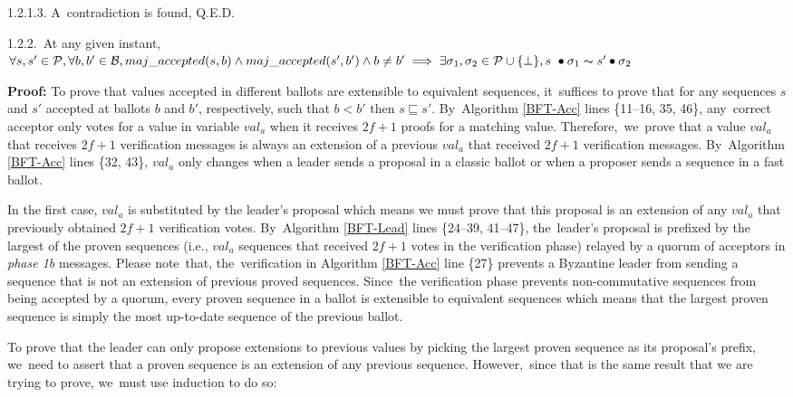 \documentclass[algorithms,article,accept,moreauthors,pdftex,10pt,a4paper]{Definitions/mdpi}
\begin{document}
\indent\indent\indent\indent\indent\indent\indent\parbox{\linewidth}{\strut1.2.1.3. A~contradiction is found, Q.E.D. }\par
\indent\indent\indent\indent\indent\parbox{\linewidth-11mm-\algorithmicindent*5}{\strut1.2.2.~At any given instant, $\forall s,s' \in \mathcal{P},\forall b,b' \in \mathcal{B}, maj\_accepted(s,b) \land maj\_accepted(s',b') \land b \neq b' \implies \exists \sigma_1,\sigma_2 \in \mathcal{P} \cup \{\bot\}, s~\bullet \sigma_1 \thicksim s' \bullet \sigma_2$} 
\indent\indent\indent\indent\indent\indent\parbox{\linewidth-13mm-\algorithmicindent*6}{\strut\textbf{Proof:} To prove that values accepted in different ballots are extensible to equivalent sequences, it~suffices to prove that for any sequences $s$ and $s'$ accepted at ballots $b$ and $b'$, respectively, such that $b < b'$ then $s \sqsubseteq s'$. By~Algorithm \ref{BFT-Acc} lines \{11--16, 35, 46\}, any~correct acceptor only votes for a value in variable $val_a$ when it receives $2f+1$ proofs for a matching value. Therefore,~we~prove that a value $val_a$ that receives $2f+1$ verification messages is always an extension of a previous $val_a$ that received $2f+1$ verification messages. By~Algorithm \ref{BFT-Acc} lines \{32, 43\}, $val_a$ only changes when a leader sends a proposal in a classic ballot or when a proposer sends a sequence in a fast ballot.\strut}
\indent\indent\indent\indent\indent\indent\parbox{\linewidth-13mm-\algorithmicindent*6}{\strut In the first case, $val_a$ is substituted by the leader's proposal which means we must prove that this proposal is an extension of any $val_a$ that previously obtained $2f+1$ verification votes. By~Algorithm \ref{BFT-Lead} lines \{24--39, 41--47\}, the~leader's proposal is prefixed by the largest of the proven sequences (i.e., $val_a$ sequences that received $2f+1$ votes in the verification phase) relayed by a quorum of acceptors in \textit{phase 1b} messages. Please note~that, the~verification in Algorithm \ref{BFT-Acc} line \{27\} prevents a Byzantine leader from sending a sequence that is not an extension of previous proved sequences. Since~the verification phase prevents non-commutative sequences from being accepted by a quorum, every proven sequence in a ballot is extensible to equivalent sequences which means that the largest proven sequence is simply the most up-to-date sequence of the previous ballot. \strut}
\indent\indent\indent\indent\indent\indent\parbox{\linewidth-13mm-\algorithmicindent*6}{\strut To prove that the leader can only propose extensions to previous values by picking the largest proven sequence as its proposal's prefix, we~need to assert that a proven sequence is an extension of any previous sequence. However,~since that is the same result that we are trying to prove, we~must use induction to do so:\strut}
\end{document}

